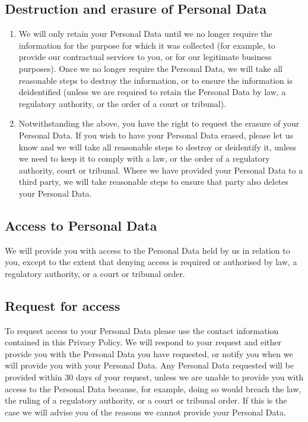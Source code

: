 \documentclass[10pt]{article}
\begin{document}
\subsection{Destruction and erasure of Personal Data}
\begin{enumerate}
	\item We will only retain your Personal Data until we no longer require the information for the purpose for which it was collected (for example, to provide our contractual services to you, or for our legitimate business purposes). Once we no longer require the Personal Data, we will take all reasonable steps to destroy the information, or to ensure the information is deidentified (unless we are required to retain the Personal Data by law, a regulatory authority, or the order of a court or tribunal).

	\item Notwithstanding the above, you have the right to request the erasure of your Personal Data. If you wish to have your Personal Data erased, please let us know and we will take all reasonable steps to destroy or deidentify it, unless we need to keep it to comply with a law, or the order of a regulatory authority, court or tribunal. Where we have provided your Personal Data to a third party, we will take reasonable steps to ensure that party also deletes your Personal Data.
\end{enumerate}

\subsection{Access to Personal Data}
We will provide you with access to the Personal Data held by us in relation to you, except to the extent that denying access is required or authorised by law, a regulatory authority, or a court or tribunal order.

\subsection{Request for access}
To request access to your Personal Data please use the contact information contained in this Privacy Policy. We will respond to your request and either provide you with the Personal Data you have requested, or notify you when we will provide you with your Personal Data. Any Personal Data requested will be provided within 30 days of your request, unless we are unable to provide you with access to the Personal Data because, for example, doing so would breach the law, the ruling of a regulatory authority, or a court or tribunal order. If this is the case we will advise you of the reasons we cannot provide your Personal Data.
\end{document}
